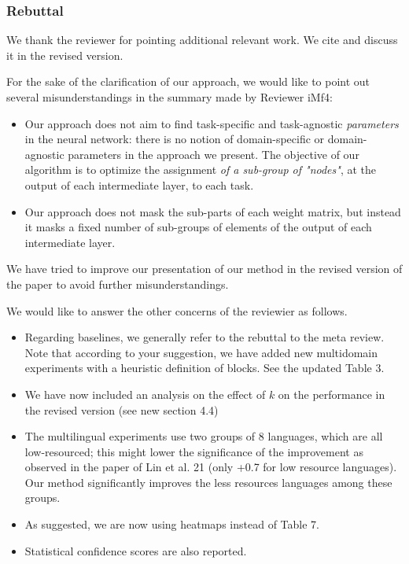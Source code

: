 \documentclass[12pt,times,a4paper,twoside]{article}
\theoremstyle{definition}
\begin{document}
\subsubsection*{Rebuttal}
{\color{blue}%
We thank the reviewer for pointing additional relevant work. We cite and discuss it in the revised version.

For the sake of the clarification of our approach, we would like to point out several misunderstandings in the summary made by Reviewer iMf4:
\begin{itemize}
\item Our approach does not aim to find task-specific and task-agnostic \emph{parameters} in the neural network: there is no notion of domain-specific or domain-agnostic parameters in the approach we present. The objective of our algorithm is to optimize the assignment \emph{of a sub-group of "nodes"}, at the output of each intermediate layer, to each task.
\item Our approach does not mask the sub-parts of each weight matrix, but instead it masks a fixed number of sub-groups of elements of the output of each intermediate layer.
\end{itemize}
We have tried to improve our presentation of our method in the revised version of the paper to avoid further misunderstandings.

We would like to answer the other concerns of the reviewier as follows. 
\begin{itemize} 
\item Regarding baselines, we generally refer to the rebuttal to the meta review. Note that according to your suggestion, we have added new multidomain experiments with a heuristic definition of blocks. See the updated Table $3$.
\item We have now included an analysis on the effect of $k$ on the performance in the revised version (see new section 4.4)
\item The multilingual experiments use two groups of $8$ languages, which are all low-resourced; this might lower the significance of the improvement as observed in the paper of Lin et al. 21 (only +0.7 for low resource languages). Our method significantly improves the less resources languages among these groups.
\item As suggested, we are now using heatmaps instead of Table 7.
\item Statistical confidence scores are also reported. 
\end{itemize}
}
\end{document}

